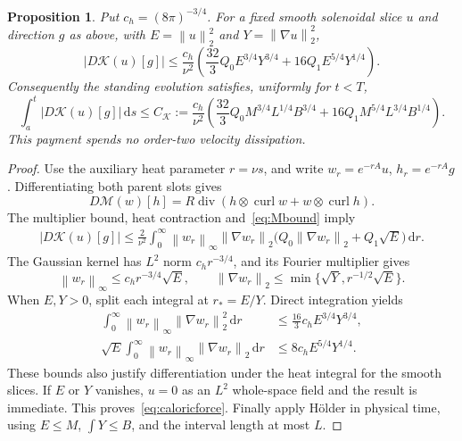 \documentclass[11pt]{article}
\newtheorem{proposition}{Proposition}
\newcommand{\dd}{\,\mathrm d}
\newcommand{\norm}[1]{\left\lVert#1\right\rVert}
\newcommand{\curl}{\operatorname{curl}}
\begin{document}
\begin{proposition}\label{prop:caloricforce}
Put $c_h=(8\pi)^{-3/4}$. For a fixed smooth solenoidal slice $u$ and
direction $g$ as above, with $E=\norm u_2^2$ and $Y=\norm{\nabla u}_2^2$,
\begin{equation}\label{eq:caloricforce}
 |D\mathcal K(u)[g]|\leq\frac{c_h}{\nu^2}
 \left(\frac{32}{3}Q_0 E^{3/4}Y^{3/4}
                 +16Q_1 E^{5/4}Y^{1/4}\right).
\end{equation}
Consequently the standing evolution satisfies, uniformly for $t<T$,
\begin{equation}\label{eq:caloricforceintegral}
 \int_a^t|D\mathcal K(u)[g]|\dd s\leq C_{\mathcal K}:=
 \frac{c_h}{\nu^2}\left(
 \frac{32}{3}Q_0 M^{3/4}L^{1/4}B^{3/4}
       +16Q_1 M^{5/4}L^{3/4}B^{1/4}\right).
\end{equation}
This payment spends no order-two velocity dissipation.
\end{proposition}
\begin{proof}
Use the auxiliary heat parameter $r=\nu s$, and write
$w_r=e^{-rA}u$, $h_r=e^{-rA}g$. Differentiating both parent slots gives
\[
 D\mathcal M(w)[h]
 =R\operatorname{div}(h\otimes\curl w+w\otimes\curl h).
\]
The multiplier bound, heat contraction and~\eqref{eq:Mbound} imply
\begin{align*}
 |D\mathcal K(u)[g]|\leq\frac2{\nu^2}
 \int_0^\infty \norm{w_r}_\infty\norm{\nabla w_r}_2
 \bigl(Q_0\norm{\nabla w_r}_2+Q_1\sqrt E\bigr)\dd r.
\end{align*}
The Gaussian kernel has $L^2$ norm $c_hr^{-3/4}$, and its Fourier
multiplier gives
\[
 \norm{w_r}_\infty\leq c_hr^{-3/4}\sqrt E,\qquad
 \norm{\nabla w_r}_2\leq\min\{\sqrt Y,r^{-1/2}\sqrt E\}.
\]
When $E,Y>0$, split each integral at $r_*=E/Y$. Direct integration yields
\begin{align*}
 \int_0^\infty\norm{w_r}_\infty\norm{\nabla w_r}_2^2\dd r
 &\leq\frac{16}{3}c_h E^{3/4}Y^{3/4},\\
 \sqrt E\int_0^\infty\norm{w_r}_\infty\norm{\nabla w_r}_2\dd r
 &\leq 8c_h E^{5/4}Y^{1/4}.
\end{align*}
These bounds also justify differentiation under the heat integral for
the smooth slices. If $E$ or $Y$ vanishes, $u=0$ as an $L^2$ whole-space
field and the result is immediate. This proves~\eqref{eq:caloricforce}.
Finally apply H\"older in physical time, using $E\leq M$,
$\int Y\leq B$, and the interval length at most $L$.
\end{proof}
\end{document}
